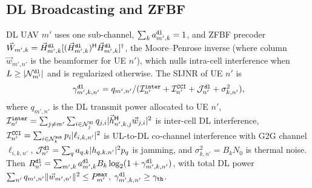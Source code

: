 \documentclass[journal]{IEEEtran}
\begin{document}
\subsection{DL Broadcasting and ZFBF}
\label{sec:dl}
DL UAV $m'$ uses one sub-channel, $\sum_k a_{m',k}^{\tt dl}=1$, and ZFBF precoder $\vec{W}_{m',k}=\vec{H}_{m',k}^{\tt dl}[(\vec{H}_{m',k}^{\tt dl})^{\sf H}\vec{H}_{m',k}^{\tt dl}]^{\dagger}$, the Moore--Penrose inverse {(where column $\vec{w}_{m',n'}$ is the beamformer for UE $n'$)}, which nulls intra-cell interference when $L\ge|\mathcal{N}_{m'}^{\tt dl}|$ and is regularized otherwise. The SIJNR of UE $n'$ is
\begin{equation}
\textstyle\gamma_{m',k,n'}^{\tt dl}=q_{m',n'}/(\mathcal{I}_{n'}^{\tt inter}+\mathcal{I}_{n'}^{\tt CCI}+\mathcal{J}_{n'}^{\tt dl}+\sigma_{k,n'}^2),
\label{eq:dl_sijnr}
\end{equation}
where {$q_{m',n'}$ is the DL transmit power allocated to UE $n'$}, $\mathcal{I}_{n'}^{\tt inter}=\sum_{j\neq m'}\sum_{i\in\mathcal{N}_j^{\tt dl}}q_{j,i}|\vec{h}_{n',k,j}^{\sf H}{\vec{w}_{j,i}}|^2$ is inter-cell DL interference,
$\mathcal{I}_{n'}^{\tt CCI}=\sum_{i\in\mathcal{N}_k^{\tt sub}}p_i|\ell_{i,k,n'}|^2$ is UL-to-DL co-channel interference with G2G channel $\ell_{i,k,n'}$,
$\mathcal{J}_{n'}^{\tt dl}=\sum_{q}a_{q,k}|h_{q,k,n'}|^2 p_q$ is jamming, and
$\sigma_{k,n'}^2=B_k N_0$ is thermal noise.
Then $R_{n'}^{\tt dl}=\sum_{m',k}a_{m',k}^{\tt dl}B_k\log_2(1+\gamma_{m',k,n'}^{\tt dl})$, with total DL power $\sum_{n'}q_{m',n'}\Vert\vec{w}_{m',n'}\Vert^2\le P_{m'}^{\tt max}$, $\gamma_{m',k,n'}^{\tt dl}\ge\gamma_{\tt th}$.
\end{document}
